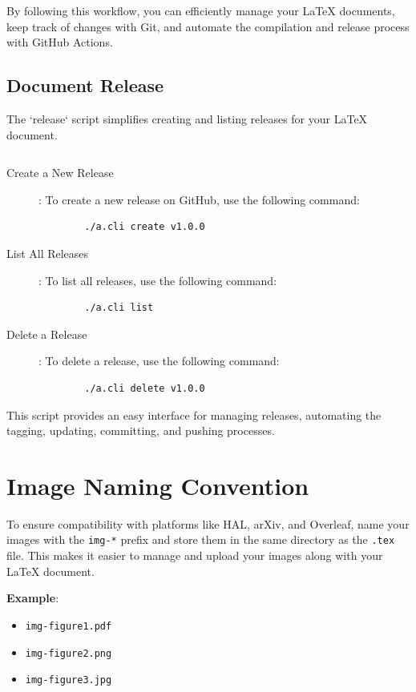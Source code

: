 \documentclass[a4paper]{article}
\begin{document}
By following this workflow, you can efficiently manage your LaTeX documents, keep track of changes with Git, and automate the compilation and release process with GitHub Actions.

\subsection{Document Release}

The `release` script simplifies creating and listing releases for your LaTeX document. 

\inputminted[linenos, fontsize=\small, bgcolor=background,firstline=25,lastline=66]{sh}{a.cli}



\begin{description}
    \item[Create a New Release]: To create a new release on GitHub, use the following command:
    \begin{verbatim}
        ./a.cli create v1.0.0
    \end{verbatim}
    \item[List All Releases]: To list all releases, use the following command:
    \begin{verbatim}
        ./a.cli list
    \end{verbatim}
    \item[Delete a Release]: To delete a release, use the following command:
    \begin{verbatim}
        ./a.cli delete v1.0.0
    \end{verbatim}

\end{description}

This script provides an easy interface for managing releases, automating the tagging, updating, committing, and pushing processes.


\section{Image Naming Convention}

To ensure compatibility with platforms like HAL, arXiv, and Overleaf, name your images with the \texttt{img-*} prefix and store them in the same directory as the \texttt{.tex} file. 
This makes it easier to manage and upload your images along with your LaTeX document.

\textbf{Example}:
\begin{itemize}
    \item \texttt{img-figure1.pdf}
    \item \texttt{img-figure2.png}
    \item \texttt{img-figure3.jpg}
\end{itemize}
\end{document}
